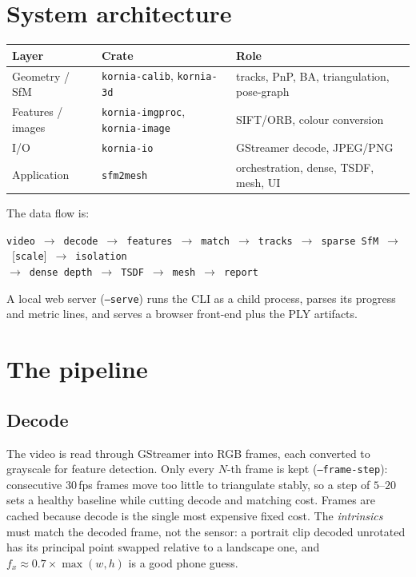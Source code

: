 \documentclass[11pt,a4paper]{article}
\newcommand{\code}[1]{\texttt{#1}}
\begin{document}
\section{System architecture}
\label{sec:arch}

\begin{center}\small
\begin{tabular}{lll}
\toprule
\textbf{Layer} & \textbf{Crate} & \textbf{Role}\\
\midrule
Geometry / SfM & \code{kornia-calib}, \code{kornia-3d} & tracks, PnP, BA, triangulation, pose-graph\\
Features / images & \code{kornia-imgproc}, \code{kornia-image} & SIFT/ORB, colour conversion\\
I/O & \code{kornia-io} & GStreamer decode, JPEG/PNG\\
Application & \code{sfm2mesh} & orchestration, dense, TSDF, mesh, UI\\
\bottomrule
\end{tabular}
\end{center}

The data flow is:

\begin{center}\small
\texttt{video}\ $\to$\ \texttt{decode}\ $\to$\ \texttt{features}\ $\to$\ \texttt{match}\ $\to$\ \texttt{tracks}\ $\to$\ \texttt{sparse SfM}\ $\to$\ [\texttt{scale}]\ $\to$\ \texttt{isolation}\\[0.25em]
$\to$\ \texttt{dense depth}\ $\to$\ \texttt{TSDF}\ $\to$\ \texttt{mesh}\ $\to$\ \texttt{report}
\end{center}

A local web server (\code{--serve}) runs the CLI as a child process, parses its progress and
metric lines, and serves a browser front-end plus the PLY artifacts.

\section{The pipeline}
\label{sec:pipeline}

\subsection{Decode}
\label{sec:decode}

The video is read through GStreamer into RGB frames, each converted to grayscale for feature
detection. Only every $N$-th frame is kept (\code{--frame-step}): consecutive 30\,fps frames
move too little to triangulate stably, so a step of $5$--$20$ sets a healthy baseline while
cutting decode and matching cost. Frames are cached because decode is the single most
expensive fixed cost. The \emph{intrinsics} must match the decoded frame, not the sensor: a
portrait clip decoded unrotated has its principal point swapped relative to a landscape one,
and $f_x \approx 0.7\times\max(w,h)$ is a good phone guess.
\end{document}
